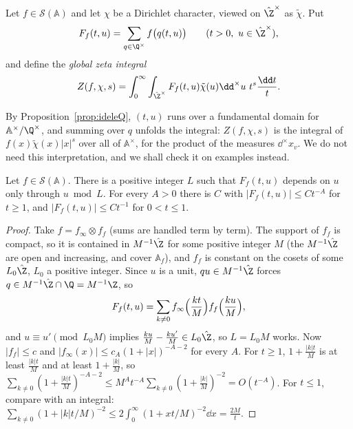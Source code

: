 \begin{definition}
Let $f\in\mathcal S(\mathbb{A})$ and let $\chi$ be a Dirichlet character, viewed on $\hat{\Z}^\times$ as $\tilde\chi$. Put
\[
F_f(t,u)=\sum_{q\in\Q^\times}f\bigl(q(t,u)\bigr)\qquad(t>0,\ u\in\hat{\Z}^\times),
\]
and define the \emph{global zeta integral}
\[
Z(f,\chi,s)=\int_0^\infty\int_{\hat{\Z}^\times}F_f(t,u)\tilde\chi(u)\dd^\times u\ t^s\frac{\dd t}t.
\]
\end{definition}

By Proposition~\ref{prop:ideleQ}, $(t,u)$ runs over a fundamental domain for $\mathbb{A}^\times/\Q^\times$, and summing over $q$ unfolds the integral:
$Z(f,\chi,s)$ is the integral of $f(x)\tilde\chi(x)|x|^s$ over all of $\mathbb{A}^\times$, for the product of the measures $\dd^\times x_v$. We do not
need this interpretation, and we shall check it on examples instead.

\begin{lemma}\label{lem:Fbounds}
Let $f\in\mathcal S(\mathbb{A})$. There is a positive integer $L$ such that $F_f(t,u)$ depends on $u$ only through $u\bmod L$. For every $A>0$
there is $C$ with $|F_f(t,u)|\le Ct^{-A}$ for $t\ge1$, and $|F_f(t,u)|\le Ct^{-1}$ for $0<t\le1$.
\end{lemma}
\begin{proof}
Take $f=f_\infty\otimes f_f$ (sums are handled term by term). The support of $f_f$ is compact, so it is contained in $M^{-1}\hat{\Z}$ for some
positive integer $M$ (the $M^{-1}\hat{\Z}$ are open and increasing, and cover $\mathbb{A}_f$), and $f_f$ is constant on the cosets of some $L_0\hat{\Z}$, $L_0$ a
positive integer. Since $u$ is a unit, $qu\in M^{-1}\hat{\Z}$ forces $q\in M^{-1}\hat{\Z}\cap\Q=M^{-1}\Z$, so
\[
F_f(t,u)=\sum_{k\ne0}f_\infty\Bigl(\frac{kt}M\Bigr)f_f\Bigl(\frac{ku}M\Bigr),
\]
and $u\equiv u'\pmod{L_0M}$ implies $\frac{ku}M-\frac{ku'}M\in L_0\hat{\Z}$, so $L=L_0M$ works. Now $|f_f|\le c$ and
$|f_\infty(x)|\le c_A(1+|x|)^{-A-2}$ for every $A$. For $t\ge1$, $1+\frac{|k|t}M$ is at least $\frac{|k|t}M$ and at least $1+\frac{|k|}M$, so
$\sum_{k\ne0}(1+\frac{|k|t}M)^{-A-2}\le M^At^{-A}\sum_{k\ne0}(1+\frac{|k|}M)^{-2}=O(t^{-A})$. For $t\le1$, compare with an integral: $\sum_{k\ne0}(1+|k|t/M)^{-2}\le2\int_0^\infty(1+xt/M)^{-2}\dd x=\frac{2M}t$.
\end{proof}

